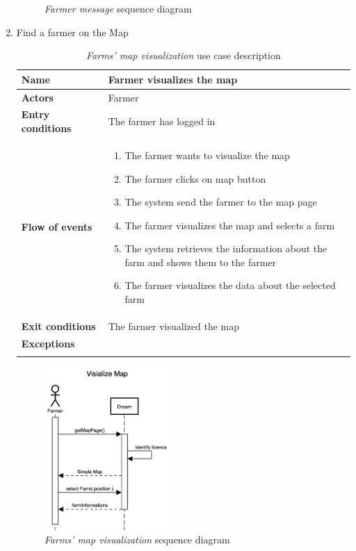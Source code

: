 \begin{enumerate}
\begin{figure}[H]
\begin{center}
            \caption{\emph{Farmer message} sequence diagram}
            \label{fig:sequence3}
        \end{center}
        \end{figure}

    \item Find a farmer on the Map\\
    \begin{longtable}{p{0.26\linewidth}p{0.75\linewidth}}
        \toprule
        \textbf{Name} & \textbf{Farmer visualizes the map} \\
        \midrule
        \textbf{Actors} & Farmer \\
        \midrule
        \textbf{Entry conditions} & The farmer has logged in\\
        \midrule
        \textbf{Flow of events} & 
        \begin{enumerate}
            \item The farmer wants to visualize the map
            \item The farmer clicks on map button
            \item The system send the farmer to the map page
            \item The farmer visualizes the map and selects a farm
            \item The system retrieves the information about the farm and shows them to the farmer
            \item The farmer visualizes the data about the selected farm
        \end{enumerate} \\
        \midrule
        \textbf{Exit conditions} & The farmer visualized the map\\
        \midrule
        \textbf{Exceptions} & \\
        \bottomrule
        \caption{\emph{Farms' map visualization} use case description}
    \end{longtable}
    \begin{figure}[H]
        \begin{center}
        \includegraphics[width=0.45\textwidth]{sequence/VisializeMap.png}
        \caption{\emph{Farms' map visualization} sequence diagram}
        \label{fig:sequence4}
        \end{center}
    \end{figure}
    

\end{enumerate}
